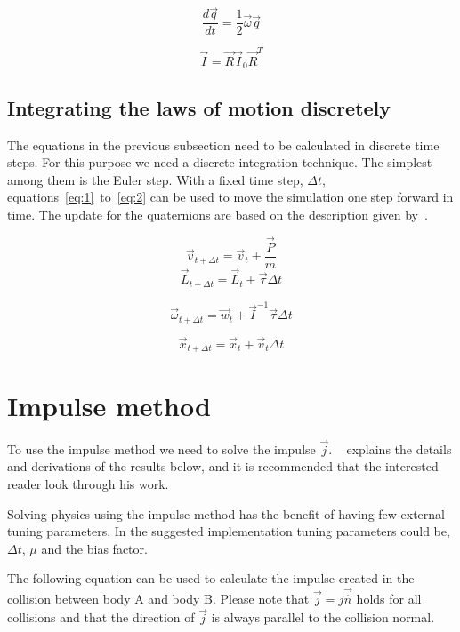 \begin{equation}
  \frac{d\vec{q}}{dt} = \frac{1}{2}\vec{\omega}\vec{q}
\end{equation}

\begin{equation}
  \vec{I} = \vec{R}\vec{I}_0\vec{R}^T
\end{equation}

\subsection{Integrating the laws of motion discretely}
The equations in the previous subsection need to be calculated in discrete time steps.
For this purpose we need a discrete integration technique. The
simplest among them is the Euler step. With a fixed time step, $\Delta t$,
equations~\ref{eq:1}~to~\ref{eq:2} can be used to move the simulation one step forward in time.
The update for the quaternions are based on the description given by~\cite{fossum}.

\begin{equation}\label{eq:1}
  \vec{v}_{t + \Delta t} = \vec{v}_{t}+\frac{\vec{P}}{m}
\end{equation}
\begin{equation}
  \vec{L}_{t + \Delta t} = \vec{L}_{t}+\vec{\tau}\Delta t
\end{equation}

\begin{equation}
  \vec{\omega}_{t + \Delta t} = \vec{w}_t+\vec{I}^{-1}\vec{\tau}\Delta t
\end{equation}

\begin{equation}\label{eq:2}
  \vec{x}_{t + \Delta t} = \vec{x}_{t} + \vec{v}_t\Delta t
\end{equation}

\section{Impulse method}\label{sec:imp}
To use the impulse method we need to solve the impulse $\vec{j}$. ~\cite{baraff} explains the details
and derivations of the results below, and it is recommended that the interested reader look through
his work.

Solving physics using the impulse method has the benefit of having few external tuning
parameters. In the suggested implementation tuning parameters could be, $\Delta t$,
$\mu$ and the bias factor.

The following equation can be used to calculate the impulse created in the
collision between body A and body B.
Please note that $\vec{j} = j\vec{\hat{n}}$ holds for all collisions and that the direction
of $\vec{j}$ is always parallel to the collision normal.

